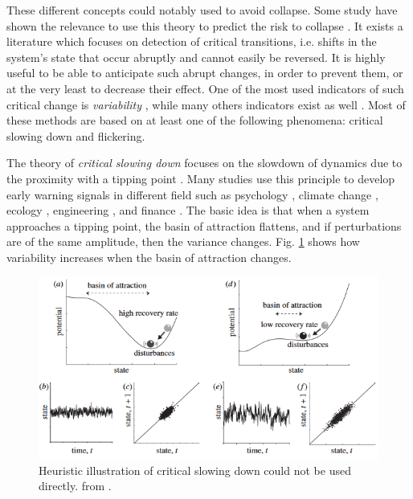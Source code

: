 \documentclass{article}
\begin{document}
\label{def_detection}
These different concepts could notably used to avoid collapse. Some study have shown the relevance to use this theory to predict the risk to collapse \citep{carr_modeling_2012, dai_generic_2012, dai_slower_2013}.
It exists a literature which focuses on detection of critical transitions, i.e. shifts in the system's state that occur abruptly and cannot easily be reversed. It is highly useful to be able to anticipate such abrupt changes, in order to prevent them, or at the very least to decrease their effect. One of the most used indicators of such critical change is \textit{variability} \citep{brock_variance_2006, carpenter2006rising, scheffer2015generic, dakos_robustness_2012, biggs_turning_2009}, while many others indicators exist as well \citep{scheffer_generic_2015,dakos_methods_2012}. Most of these methods are based on at least one of the following phenomena: critical slowing down and flickering.

The theory of \textit{critical slowing down} focuses on the slowdown of dynamics due to the proximity with a tipping point \citep{dakos_critical_2014, dakos_slowing_nodate, scheffer_anticipating_2012}. Many studies use this principle to develop early warning signals in different field such as psychology \citep{van_de_leemput_critical_2014}, climate change \citep{lenton_early_2012}, ecology \citep{chisholm_critical_2009, gandhi_critical_1998},  engineering \citep{ren_early_2015}, and finance \citep{diks_critical_2018}. The basic idea is that when a system approaches a tipping point, the basin of attraction flattens, and if perturbations are of the same amplitude, then the variance changes. Fig. \ref{fig:csd} shows how variability increases when the basin of attraction changes.

\begin{figure}[h]
\begin{center}
\includegraphics[width=12cm]{slowing_down.png}
\end{center}
\caption{\label{fig:temp}Heuristic illustration of critical slowing down could not be used directly. from \cite{lenton_early_2012}.
\label{fig:csd}
}
\end{figure}
\end{document}
